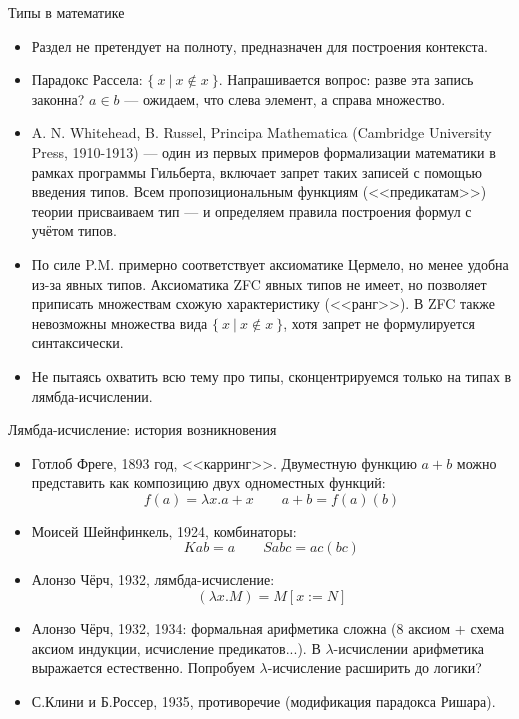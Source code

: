 \documentclass[aspectratio=169]{beamer}
\begin{document}
\begin{frame}{Типы в математике}
\begin{itemize}
\item Раздел не претендует на полноту, предназначен для построения контекста.
\item Парадокс Рассела: $\{\ x\ |\ x \notin x\ \}$. Напрашивается вопрос: разве эта запись законна?
$a \in b$ --- ожидаем, что слева элемент, а справа множество. %
\item A. N. Whitehead, B. Russel, Principa Mathematica (Cambridge University Press, 1910-1913) --- один из первых 
примеров формализации математики в рамках программы Гильберта, включает запрет таких записей с помощью введения типов.
Всем пропозициональным функциям (<<предикатам>>) теории присваиваем тип --- и определяем правила построения
формул с учётом типов. 
\item По силе P.M. примерно соответствует аксиоматике Цермело, но менее удобна из-за явных типов. 
Аксиоматика ZFC явных типов не имеет,
но позволяет приписать множествам схожую характеристику (<<ранг>>).
В ZFC также невозможны множества вида $\{\ x\ |\ x \notin x\ \}$, хотя запрет не формулируется синтаксически.
\item Не пытаясь охватить всю тему про типы, сконцентрируемся только на типах в лямбда-исчислении.
\end{itemize}
\end{frame}

\begin{frame}{Лямбда-исчисление: история возникновения}

\begin{itemize}
\item Готлоб Фреге, 1893 год, <<карринг>>. Двуместную функцию $a + b$ 
можно представить как композицию двух одноместных функций: $$f(a) = \lambda x. a + x\quad\quad a + b = f(a)(b)$$
\item Моисей Шейнфинкель, 1924, комбинаторы: $$Kab = a\quad\quad Sabc = ac(bc)$$
\item Алонзо Чёрч, 1932, лямбда-исчисление: $$(\lambda x.M) = M[x := N]$$
\item Алонзо Чёрч, 1932, 1934:
формальная арифметика сложна (8 аксиом + схема аксиом индукции, исчисление предикатов...). 
В $\lambda$-исчислении арифметика выражается естественно. Попробуем $\lambda$-исчисление
расширить до логики?
\item С.Клини и Б.Россер, 1935, противоречие (модификация парадокса Ришара).
\end{itemize}
\end{frame}
\end{document}
